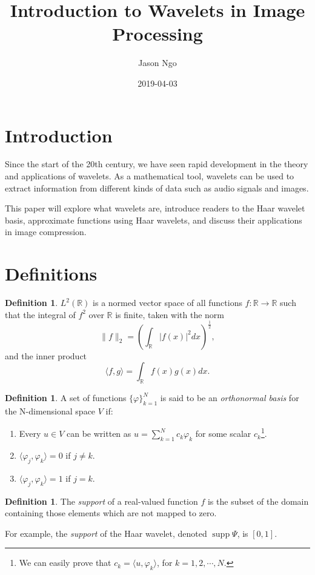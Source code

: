 \documentclass[11pt]{amsart}
\title{Introduction to Wavelets in Image Processing}
\author{Jason Ngo}
\date{2019-04-03}
\newcommand{\info}[1]{\todo[linecolor=OliveGreen,backgroundcolor=OliveGreen!25,bordercolor=OliveGreen]{#1}}
\theoremstyle{theorem} %
\theoremstyle{definition}
\newtheorem{defn}[thm]{Definition}
\theoremstyle{example}
\theoremstyle{remark}
\numberwithin{equation}{section}
\newcommand{\R}{\mathbb{R}}
\DeclareMathOperator*{\supp}{supp}
\begin{document}
\maketitle

\section{Introduction}
Since the start of the 20th century, we have seen rapid development in the theory and applications of wavelets. As a mathematical tool, wavelets can be used to extract information from different kinds of data such as audio signals and images.

This paper will explore what wavelets are, introduce readers to the Haar wavelet basis, approximate functions using Haar wavelets, and discuss their applications in image compression.

\section{Definitions}
\info{Cite this section.}
\begin{defn} \label{def:l2}
	\emph{$ L^2(\R) $} is a normed vector space of all functions $ f: \R \to \R $ such that the integral of $ f^2 $ over $ \R $ is finite, taken with the norm
	\[ \|f\|_2 = \left( \int_{\R} |f(x)|^2 dx \right)^{\frac{1}{2}}, \]
	and the inner product
	\[ \langle f,g \rangle = \int_{\R} f(x) g(x)  dx. \]
\end{defn}

\begin{defn} \label{def:orthonormal}
	A set of functions $ \{ \varphi \}_{k=1}^N $ is said to be an \emph{orthonormal basis} for the N-dimensional space $ V $ if:
	\begin{enumerate}
		\item Every $ u \in V $ can be written as $ u = \sum_{k=1}^N c_k \varphi_k $ for some scalar $ c_k $\footnote{We can easily prove that $ c_k = \langle u,\varphi_k \rangle $, for $ k = 1,2,\cdots,N. $}.
		\item $ \langle \varphi_j, \varphi_k \rangle = 0 $ if $ j \neq k $.
		\item $ \langle \varphi_j, \varphi_k \rangle = 1 $ if $ j = k $.
	\end{enumerate}
\end{defn}

\begin{defn} \label{def:support}
	The \emph{support} of a real-valued function $ f $ is the subset of the domain containing those elements which are not mapped to zero.	
	
	For example, the \emph{support} of the Haar wavelet, denoted $ \supp \varPsi $, is $ [0,1] $.
\end{defn}
\end{document}
